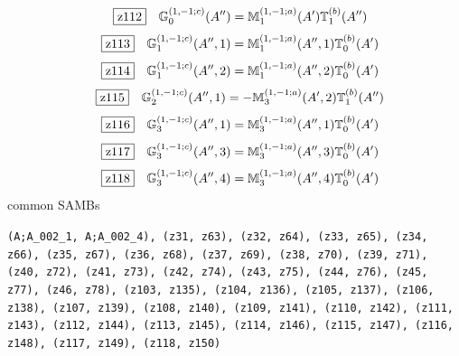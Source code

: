 \documentclass[fleqn,10pt,landscape]{jsarticle}
\begin{document}
\begin{dmath*}
\hspace*{3mm}\fbox{z112}\quad \mathbb{G}_{0}^{(1,-1;c)}(A^{\prime\prime})=\mathbb{M}_{1}^{(1,-1;a)}(A^{\prime}) \mathbb{T}_{1}^{(b)}(A^{\prime\prime})
\end{dmath*}
\begin{dmath*}
\hspace*{3mm}\fbox{z113}\quad \mathbb{G}_{1}^{(1,-1;c)}(A^{\prime\prime},1)=\mathbb{M}_{1}^{(1,-1;a)}(A^{\prime\prime},1) \mathbb{T}_{0}^{(b)}(A^{\prime})
\end{dmath*}
\begin{dmath*}
\hspace*{3mm}\fbox{z114}\quad \mathbb{G}_{1}^{(1,-1;c)}(A^{\prime\prime},2)=\mathbb{M}_{1}^{(1,-1;a)}(A^{\prime\prime},2) \mathbb{T}_{0}^{(b)}(A^{\prime})
\end{dmath*}
\begin{dmath*}
\hspace*{3mm}\fbox{z115}\quad \mathbb{G}_{2}^{(1,-1;c)}(A^{\prime\prime},1)=- \mathbb{M}_{3}^{(1,-1;a)}(A^{\prime},2) \mathbb{T}_{1}^{(b)}(A^{\prime\prime})
\end{dmath*}
\begin{dmath*}
\hspace*{3mm}\fbox{z116}\quad \mathbb{G}_{3}^{(1,-1;c)}(A^{\prime\prime},1)=\mathbb{M}_{3}^{(1,-1;a)}(A^{\prime\prime},1) \mathbb{T}_{0}^{(b)}(A^{\prime})
\end{dmath*}
\begin{dmath*}
\hspace*{3mm}\fbox{z117}\quad \mathbb{G}_{3}^{(1,-1;c)}(A^{\prime\prime},3)=\mathbb{M}_{3}^{(1,-1;a)}(A^{\prime\prime},3) \mathbb{T}_{0}^{(b)}(A^{\prime})
\end{dmath*}
\begin{dmath*}
\hspace*{3mm}\fbox{z118}\quad \mathbb{G}_{3}^{(1,-1;c)}(A^{\prime\prime},4)=\mathbb{M}_{3}^{(1,-1;a)}(A^{\prime\prime},4) \mathbb{T}_{0}^{(b)}(A^{\prime})
\end{dmath*}
\noindent * common SAMBs

\noindent\texttt{(A;A_002_1, A;A_002_4), (z31, z63), (z32, z64), (z33, z65), (z34, z66), (z35, z67), (z36, z68), (z37, z69), (z38, z70), (z39, z71), (z40, z72), (z41, z73), (z42, z74), (z43, z75), (z44, z76), (z45, z77), (z46, z78), (z103, z135), (z104, z136), (z105, z137), (z106, z138), (z107, z139), (z108, z140), (z109, z141), (z110, z142), (z111, z143), (z112, z144), (z113, z145), (z114, z146), (z115, z147), (z116, z148), (z117, z149), (z118, z150)}
\vspace{5mm}
\end{document}
